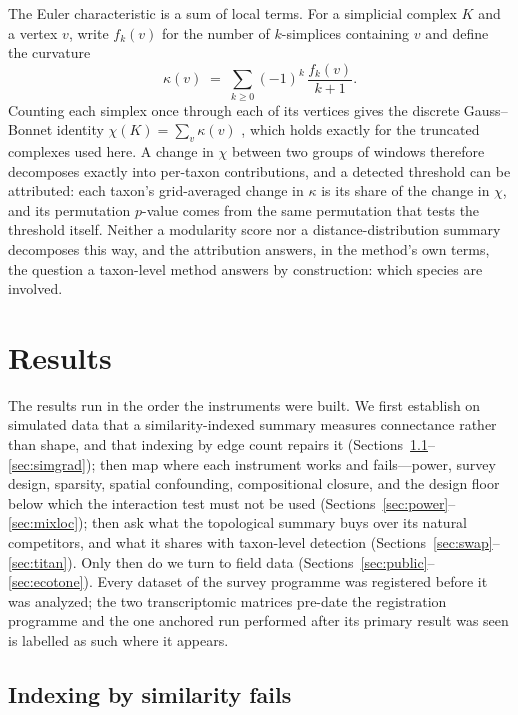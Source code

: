 \documentclass[review,12pt,authoryear]{elsarticle}
\theoremstyle{remark}
\begin{document}
The Euler characteristic is a sum of local terms. For a simplicial complex
$K$ and a vertex $v$, write $f_k(v)$ for the number of $k$-simplices
containing $v$ and define the curvature
\[
  \kappa(v) \;=\; \sum_{k \ge 0} (-1)^{k}\, \frac{f_k(v)}{k+1}.
\]
Counting each simplex once through each of its vertices gives the discrete
Gauss--Bonnet identity $\chi(K) = \sum_{v} \kappa(v)$
\citep{knill2012gaussbonnet}, which holds exactly for the truncated
complexes used here. A change in $\chi$ between two groups of windows
therefore decomposes exactly into per-taxon contributions, and a detected
threshold can be attributed: each taxon's grid-averaged change in
$\kappa$ is its share of the change in $\chi$, and its permutation
$p$-value comes from the same permutation that tests the threshold itself.
Neither a modularity score nor a distance-distribution summary decomposes
this way, and the attribution answers, in the method's own terms, the
question a taxon-level method answers by construction: which species are
involved.

\section{Results}
\label{sec:sim}

The results run in the order the instruments were built. We first establish
on simulated data that a similarity-indexed summary measures connectance
rather than shape, and that indexing by edge count repairs it
(Sections~\ref{sec:simfail}--\ref{sec:simgrad}); then map where each
instrument works and fails---power, survey design, sparsity, spatial
confounding, compositional closure, and the design floor below which the
interaction test must not be used
(Sections~\ref{sec:power}--\ref{sec:mixloc}); then ask what the topological
summary buys over its natural competitors, and what it shares with
taxon-level detection (Sections~\ref{sec:swap}--\ref{sec:titan}). Only then
do we turn to field data (Sections~\ref{sec:public}--\ref{sec:ecotone}).
Every dataset of the survey programme was registered before it was analyzed;
the two transcriptomic matrices pre-date the registration programme and the
one anchored run performed after its primary result was seen is labelled as
such where it appears.

\subsection{Indexing by similarity fails}
\label{sec:simfail}
\end{document}
